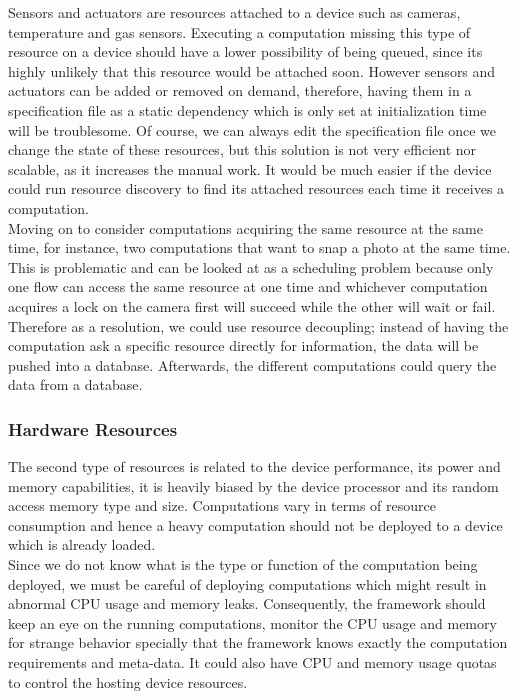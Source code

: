   Sensors and actuators are resources attached to a device such as cameras, temperature and gas sensors. Executing a computation missing this type of resource on a device should have a lower possibility of being queued, since its highly unlikely that this resource would be attached soon. However sensors and actuators can be added or removed on demand, therefore, having them in a specification file as a static dependency which is only set at initialization time will be troublesome. Of course, we can always edit the specification file once we change the state of these resources, but this solution is not very efficient nor scalable, as it increases the manual work. It would be much easier if the device could run resource discovery to find its attached resources each time it receives a computation. \\
  
  \noindent Moving on to consider computations acquiring the same resource at the same time, for instance, two computations that want to snap a photo at the same time. This is problematic and can be looked at as a scheduling problem because only one flow can access the same resource at one time and whichever computation acquires a lock on the camera first will succeed while the other will wait or fail. Therefore as a resolution, we could use resource decoupling; instead of having the computation ask a specific resource directly for information, the  data will be pushed into a database. Afterwards, the different computations could query the data from a database.
  
  

\subsubsection{Hardware Resources }

The second type of resources is related to the device performance, its power and memory capabilities, it is heavily biased by the  device processor  and its random access memory type and size. Computations vary in terms of resource consumption and hence a heavy computation should not be deployed to a device which is already loaded. \\

\noindent Since we do not know what is the type or function of the computation being deployed, we must be careful of deploying computations which might result in abnormal CPU usage and memory leaks. Consequently, the framework should keep an eye on the running computations, monitor the CPU usage and memory for strange behavior specially that the framework knows exactly the computation requirements and meta-data. It could also have CPU and memory usage quotas to control  the hosting device resources.\\

